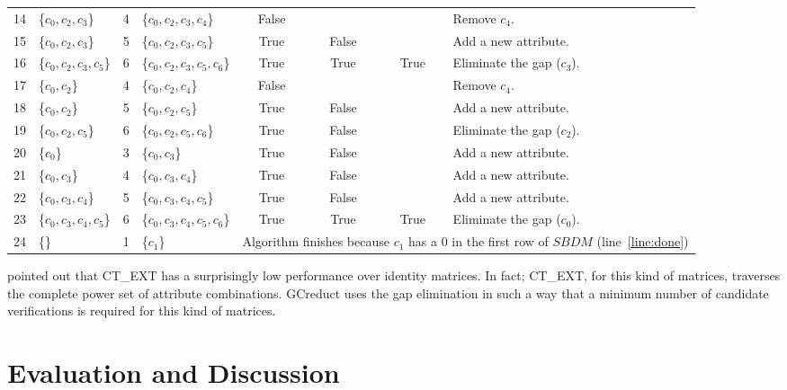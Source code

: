 \documentclass[authoryear,preprint,review,12pt]{elsarticle}
\begin{document}
\begin{table}[!htb]
\begin{tabular}{|c|l|c|l|c|c|c|l|}
    		14 & \{$c_0,c_2,c_3$\} 		& 4 & \{$c_0,c_2,c_3,c_4$\}		& False &   &   & Remove $c_4$.\\
    		15 & \{$c_0,c_2,c_3$\}		& 5 & \{$c_0,c_2,c_3,c_5$\}		& True & False &   & Add a new attribute.\\
    		16 & \{$c_0,c_2,c_3,c_5$\}	& 6 & \{$c_0,c_2,c_3,c_5,c_6$\} 	& True & True & True & Eliminate the gap ($c_3$).\\
    		17 & \{$c_0,c_2$\} 			& 4 & \{$c_0,c_2,c_4$\}			& False &   &   & Remove $c_4$.\\
    		18 & \{$c_0,c_2$\}			& 5 & \{$c_0,c_2,c_5$\}			& True & False &   & Add a new attribute.\\
    		19 & \{$c_0,c_2,c_5$\}		& 6 & \{$c_0,c_2,c_5,c_6$\}		& True & False &   & Eliminate the gap ($c_2$).\\
    		20 & \{$c_0$\} 				& 3 & \{$c_0,c_3$\}				& True & False &   & Add a new attribute.\\    		
    		21 & \{$c_0,c_3$\}			& 4 & \{$c_0,c_3,c_4$\}			& True & False &   & Add a new attribute.\\
    		22 & \{$c_0,c_3,c_4$\}		& 5 & \{$c_0,c_3,c_4,c_5$\}		& True & False &   & Add a new attribute.\\
    		23 & \{$c_0,c_3,c_4,c_5$\}	& 6 & \{$c_0,c_3,c_4,c_5,c_6$\} 	& True & True & True & Eliminate the gap ($c_0$).\\
    		\hline
    		24 & \{\} 					& 1 & \{$c_1$\} 					& 
    		\multicolumn{4}{l|}{\scriptsize Algorithm finishes because $c_1$ has a 0 in the first row of $SBDM$ (line~\ref{line:done})}\\
    		\hline
		\end{tabular}
	\end{table}
	
	\cite{Alba14} pointed out that CT\_EXT has a surprisingly low performance over identity matrices. 
	In fact; CT\_EXT, for this kind of matrices, traverses the complete power set of attribute combinations. 
	GCreduct uses the gap elimination in such a way that a minimum number of candidate verifications is required 
	for this kind of matrices.
%
\section{Evaluation and Discussion}\label{evaluation}
\end{document}
